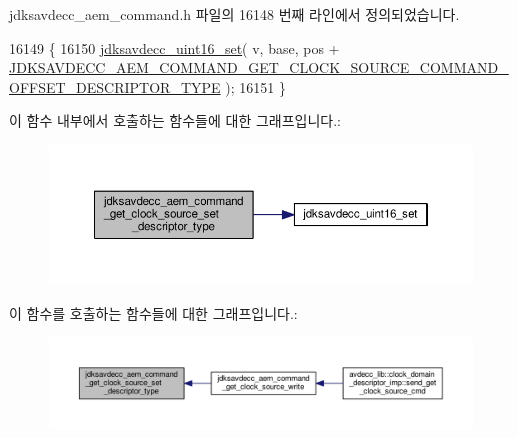 jdksavdecc\+\_\+aem\+\_\+command.\+h 파일의 16148 번째 라인에서 정의되었습니다.


\begin{DoxyCode}
16149 \{
16150     \hyperlink{group__endian_ga14b9eeadc05f94334096c127c955a60b}{jdksavdecc\_uint16\_set}( v, base, pos + 
      \hyperlink{group__command__get__clock__source_ga1a53766ae2accfd857b921de9f98ff56}{JDKSAVDECC\_AEM\_COMMAND\_GET\_CLOCK\_SOURCE\_COMMAND\_OFFSET\_DESCRIPTOR\_TYPE}
       );
16151 \}
\end{DoxyCode}


이 함수 내부에서 호출하는 함수들에 대한 그래프입니다.\+:
\nopagebreak
\begin{figure}[H]
\begin{center}
\leavevmode
\includegraphics[width=350pt]{group__command__get__clock__source_ga01a3ffdc1b579aa1a4fbeb1fc86f80dd_cgraph}
\end{center}
\end{figure}




이 함수를 호출하는 함수들에 대한 그래프입니다.\+:
\nopagebreak
\begin{figure}[H]
\begin{center}
\leavevmode
\includegraphics[width=350pt]{group__command__get__clock__source_ga01a3ffdc1b579aa1a4fbeb1fc86f80dd_icgraph}
\end{center}
\end{figure}


